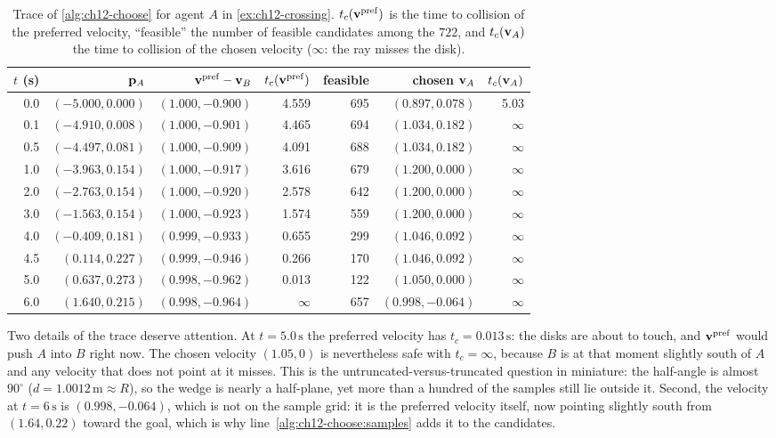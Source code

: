 \begin{table}[tb]
  \centering\small
  \caption{Trace of \cref{alg:ch12-choose} for agent $A$ in
  \cref{ex:ch12-crossing}. $t_c(\mathbf{v}^{\mathrm{pref}})$ is the time to collision
  of the preferred velocity, ``feasible'' the number of feasible candidates
  among the $722$, and $t_c(\mathbf{v}_A)$ the time to collision of the chosen
  velocity ($\infty$: the ray misses the disk).}
  \label{tab:ch12-trace}
  \begin{tabular}{@{}rrrrrrr@{}}
  \toprule
  $t$ (s) & $\mathbf{p}_A$ & $\mathbf{v}^{\mathrm{pref}}-\mathbf{v}_B$ & $t_c(\mathbf{v}^{\mathrm{pref}})$ & feasible & chosen $\mathbf{v}_A$ & $t_c(\mathbf{v}_A)$\\
  \midrule
  0.0 & $(-5.000, 0.000)$ & $(1.000,-0.900)$ & 4.559 & 695 & $(0.897, 0.078)$ & 5.03\\
  0.1 & $(-4.910, 0.008)$ & $(1.000,-0.901)$ & 4.465 & 694 & $(1.034, 0.182)$ & $\infty$\\
  0.5 & $(-4.497, 0.081)$ & $(1.000,-0.909)$ & 4.091 & 688 & $(1.034, 0.182)$ & $\infty$\\
  1.0 & $(-3.963, 0.154)$ & $(1.000,-0.917)$ & 3.616 & 679 & $(1.200, 0.000)$ & $\infty$\\
  2.0 & $(-2.763, 0.154)$ & $(1.000,-0.920)$ & 2.578 & 642 & $(1.200, 0.000)$ & $\infty$\\
  3.0 & $(-1.563, 0.154)$ & $(1.000,-0.923)$ & 1.574 & 559 & $(1.200, 0.000)$ & $\infty$\\
  4.0 & $(-0.409, 0.181)$ & $(0.999,-0.933)$ & 0.655 & 299 & $(1.046, 0.092)$ & $\infty$\\
  4.5 & $(0.114, 0.227)$ & $(0.999,-0.946)$ & 0.266 & 170 & $(1.046, 0.092)$ & $\infty$\\
  5.0 & $(0.637, 0.273)$ & $(0.998,-0.962)$ & 0.013 & 122 & $(1.050, 0.000)$ & $\infty$\\
  6.0 & $(1.640, 0.215)$ & $(0.998,-0.964)$ & $\infty$ & 657 & $(0.998,-0.064)$ & $\infty$\\
  \bottomrule
  \end{tabular}
\end{table}

Two details of the trace deserve attention. At $t = 5.0\,\mathrm{s}$ the
preferred velocity has $t_c = 0.013\,\mathrm{s}$: the disks are about to touch,
and $\mathbf{v}^{\mathrm{pref}}$ would push $A$ into $B$ right now. The chosen
velocity $(1.05, 0)$ is nevertheless safe with $t_c = \infty$, because $B$ is
at that moment slightly south of $A$ and any velocity that does not point at
it misses. This is the untruncated-versus-truncated question in miniature: the
half-angle is almost $90^\circ$ ($d = 1.0012\,\mathrm{m} \approx R$), so the
wedge is nearly a half-plane, yet more than a hundred of the samples still lie
outside it. Second, the velocity at $t = 6\,\mathrm{s}$
is $(0.998,-0.064)$, which is not on the sample grid: it is the preferred
velocity itself, now pointing slightly south from $(1.64, 0.22)$ toward the
goal, which is why line~\ref{alg:ch12-choose:samples} adds it to the candidates.

